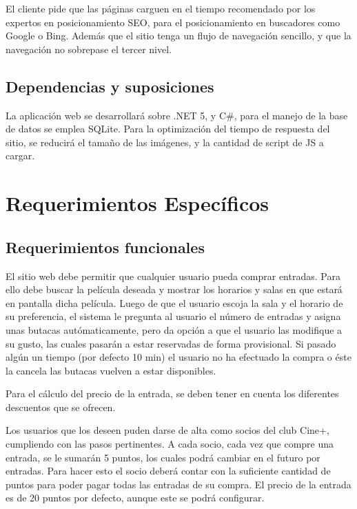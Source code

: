 \documentclass[letterpaper,12pt, oneside, onecolumn, openany]{book}
\begin{document}
El cliente pide que las páginas carguen en el tiempo recomendado por los expertos en posicionamiento SEO, para el posicionamiento en buscadores como Google o Bing. Además que el sitio tenga un flujo de navegación sencillo, y que la navegación no sobrepase el tercer nivel.

\section{Dependencias y suposiciones}

La aplicación web se desarrollará sobre .NET 5, y C\#, para el manejo de la base de datos se emplea SQLite. Para la optimización del tiempo de respuesta del sitio, se reducirá el tamaño de las imágenes, y la cantidad de script de JS a cargar. 

\chapter{Requerimientos Específicos}\label{ch:req}

\section{Requerimientos funcionales}

El sitio web debe permitir que cualquier usuario pueda comprar entradas. Para ello debe buscar la película deseada y mostrar los horarios y salas en que estará en pantalla dicha película. Luego de que el usuario escoja la sala y el horario de su preferencia, el sistema le pregunta al usuario el número de entradas y asigna unas butacas autómaticamente, pero da opción a que el usuario las modifique a su gusto, las cuales pasarán a estar reservadas de forma provisional. Si pasado algún un tiempo (por defecto 10 min) el usuario no ha efectuado la compra o éste la cancela las butacas vuelven a estar disponibles.

Para el cálculo del precio de la entrada, se deben tener en cuenta los diferentes descuentos que se ofrecen.

Los usuarios que los deseen puden darse de alta como socios del club Cine+, cumpliendo con las pasos pertinentes. A cada socio, cada vez que compre una entrada, se le sumarán 5 puntos, los cuales podrá cambiar en el futuro por entradas. Para hacer esto el socio deberá contar con la suficiente cantidad de puntos para poder pagar todas las entradas de su compra. El precio de la entrada es de 20 puntos por defecto, aunque este se podrá configurar.
\end{document}
